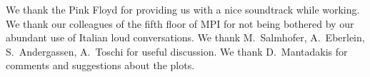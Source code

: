 \documentclass[aps,prb,twocolumn,showpacs,groupedaddress]{revtex4-1}
\begin{document}
\begin{acknowledgments}
We thank the Pink Floyd for providing us with a nice soundtrack while working. 
We thank our colleagues of the fifth floor of MPI for not being bothered by our abundant use of Italian loud conversations. 
We thank M.~Salmhofer, A.~Eberlein, S.~Andergassen, A.~Toschi for useful discussion. 
We thank D.~Mantadakis for comments and suggestions about the plots. 
\end{acknowledgments}
\begin{widetext}
\label{sec:appendices}

\end{widetext}


%

\end{document}
